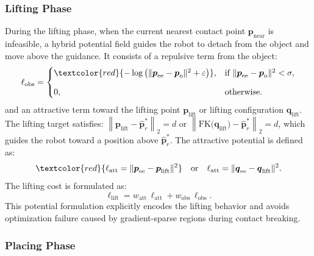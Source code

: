 \subsubsection{Lifting Phase}

During the lifting phase, when the current nearest contact point $\boldsymbol{p}_{\text{near}}$ is infeasible, a hybrid potential field guides the robot to detach from the object and move above the guidance. It consists of a repulsive term from the object:
\begin{equation}
 \ell_{\text{obs}} =
\begin{cases}
\textcolor{red}{-\log\left ( {\|\boldsymbol{p}_{\text{ee}} - \boldsymbol{p}_{\text{o}}\|^2 + \varepsilon} \right )} , &
\text{if } \|\boldsymbol{p}_{\text{ee}} - \boldsymbol{p}_{\text{o}}\|^2 < \sigma, \\[8pt]
0, & \text{otherwise.}
\end{cases}
\end{equation}
and an attractive term toward the lifting point $\boldsymbol{p}_{\text{lift}}$ or lifting configuration $\boldsymbol{q}_{\text{lift}}$. The lifting target satisfies:
$\left \| \boldsymbol{p}_{\text{lift}}-\hat{\boldsymbol{p}}_r^* \right \|_2 = d $
or
$ \left \|\text{FK}({\boldsymbol{q}_{\text{lift}})}-\hat{\boldsymbol{p}}_r^*\right \|_2 = d$,
which guides the robot toward a position above $\hat{\boldsymbol{p}}_r^*$. The attractive potential is defined as:
\begin{equation}
 \textcolor{red}{\ell_{\text{att}} = \|\boldsymbol{p}_{\text{ee}} - \boldsymbol{p}_{\text{lift}}\|^2 }
 \quad \text{or} \quad
 \ell_{\text{att}} = \|\boldsymbol{q}_{\text{ee}} - \boldsymbol{q}_{\text{lift}}\|^2.
\end{equation}
The lifting cost is formulated as:
\begin{equation}
 \ell_{\text{lift}} = w_{\text{att}} \, \ell_{\text{att}} + w_{\text{obs}} \, \ell_{\text{obs}}.
\end{equation}
This potential formulation explicitly encodes the lifting behavior and avoids optimization failure caused by gradient-sparse regions during contact breaking.

\subsubsection{Placing Phase}

